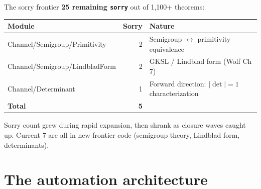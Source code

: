 \documentclass[aspectratio=169,10pt]{beamer}
\begin{document}
\begin{frame}{The sorry frontier}
    \vspace{-0.2em}
    \textbf{25 remaining \texttt{sorry}} out of 1{,}100+ theorems:
    \vspace{0.3em}
    \begin{center}
    \renewcommand{\arraystretch}{1.15}
    {\footnotesize
    \begin{tabular}{@{}l r l@{}}
        \toprule
        \textbf{Module} & \textbf{Sorry} & \textbf{Nature} \\
        \midrule
        Channel/Semigroup/Primitivity & 2 & Semigroup $\leftrightarrow$ primitivity equivalence \\
        Channel/Semigroup/LindbladForm & 2 & GKSL / Lindblad form (Wolf Ch\,7) \\
        Channel/Determinant & 1 & Forward direction: $|\det| = 1$ characterization \\
        \midrule
        \textbf{Total} & \textbf{5} & \\
        \bottomrule
    \end{tabular}
    }
    \end{center}
    \vspace{0.3em}
    \textcolor{dimwhite}{\footnotesize Sorry count grew during rapid expansion, then shrank as closure waves caught up. Current 7 are all in new frontier code (semigroup theory, Lindblad form, determinants).}
\end{frame}

\section{The automation architecture}
\end{document}
